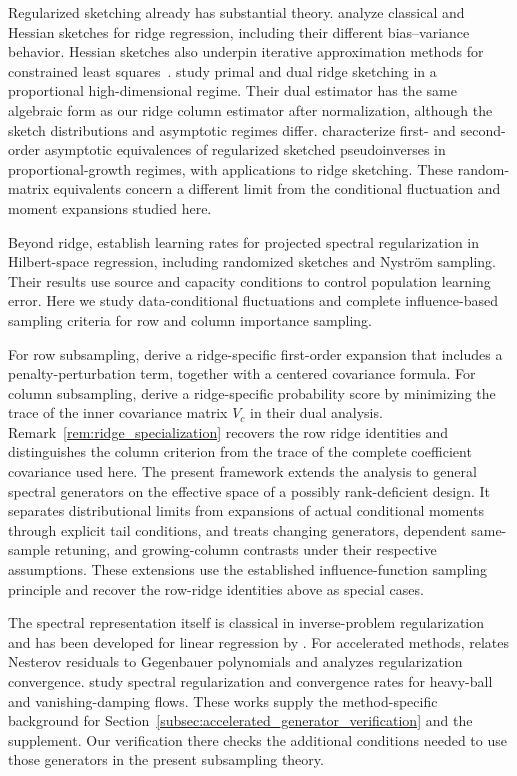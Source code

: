 \documentclass[pdflatex,iicol,sn-mathphys-ay]{sn-jnl}
\theoremstyle{thmstyleone}
\theoremstyle{thmstylethree}
\theoremstyle{thmstyletwo}
\begin{document}
Regularized sketching already has substantial theory. \citet{wang2018sketched} analyze classical and Hessian sketches for ridge
regression, including their different bias--variance behavior. Hessian
sketches also underpin iterative approximation methods for constrained least
squares~\citep{pilanci2016iterative}. \citet{liu2020ridge}
study primal and dual ridge sketching in a proportional high-dimensional
regime. Their dual estimator has the same algebraic form as our ridge column
estimator after normalization, although the sketch distributions and
asymptotic regimes differ. \citet{lejeune2024asymptotics} characterize
first- and second-order asymptotic equivalences of regularized sketched
pseudoinverses in proportional-growth regimes, with applications to ridge
sketching. These random-matrix equivalents concern a different limit from
the conditional fluctuation and moment expansions studied here.

Beyond ridge, \citet{lin2020convergences} establish learning rates for
projected spectral regularization in Hilbert-space regression, including
randomized sketches and Nystr\"om sampling. Their results use source and
capacity conditions to control population learning error. Here we study
data-conditional fluctuations and complete influence-based sampling criteria
for row and column importance sampling.

For row subsampling, \citet{chen2022optimal} derive a ridge-specific
first-order expansion that includes a penalty-perturbation term, together
with a centered covariance formula. For column subsampling, \citet{li2024optimal} derive a
ridge-specific probability score by minimizing the trace of the inner
covariance matrix $V_c$ in their dual analysis. Remark~\ref{rem:ridge_specialization}
recovers the row ridge identities and distinguishes the column criterion
from the trace of the complete coefficient covariance used here.
The present framework extends the analysis to general spectral generators
on the effective space of a possibly rank-deficient design. It separates
distributional limits from expansions of actual conditional moments through
explicit tail conditions, and treats changing generators, dependent
same-sample retuning, and growing-column contrasts under their respective
assumptions. These extensions use the established influence-function
sampling principle and recover the row-ridge identities above as special cases.

The spectral representation itself is classical in inverse-problem
regularization~\citep{engl1996regularization} and has been developed for linear
regression by \citet{wang2024linear}. For accelerated methods,
\citet{kindermann2021optimal} relates Nesterov residuals to
Gegenbauer polynomials and analyzes regularization convergence. \citet{bot2022convergence} study spectral regularization and convergence
rates for heavy-ball and vanishing-damping flows. These works supply the
method-specific background for Section~\ref{subsec:accelerated_generator_verification}
and the supplement. Our verification there checks the additional conditions
needed to use those generators in the present subsampling theory.
\end{document}
